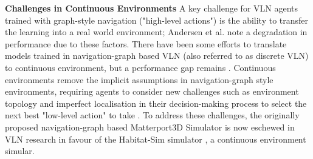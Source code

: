 \documentclass{svproc}
\begin{document}
    \textbf{Challenges in Continuous Environments}  A key challenge for VLN agents trained with graph-style navigation ("high-level actions") is the ability to transfer the learning into a real world environment; Andersen et al. \cite{anderson2020simtorealtransfervisionandlanguagenavigation} note a degradation in performance due to these factors. There have been some efforts to translate models trained in navigation-graph based VLN (also referred to as discrete VLN) to continuous environment, but a performance gap remains \cite{Hong_2022_CVPR}. Continuous environments remove the implicit assumptions in navigation-graph style environments, requiring agents to consider new challenges such as environment topology and imperfect localisation in their decision-making process to select the next best "low-level action" to take \cite{krantz2020navgraphvisionandlanguagenavigationcontinuous}. To address these challenges, the originally proposed navigation-graph based Matterport3D Simulator \cite{mattersim} is now eschewed in VLN research in favour of the Habitat-Sim simulator \cite{habitat19iccv, szot2021habitat, puig2023habitat3}, a continuous environment simular.
\end{document}
